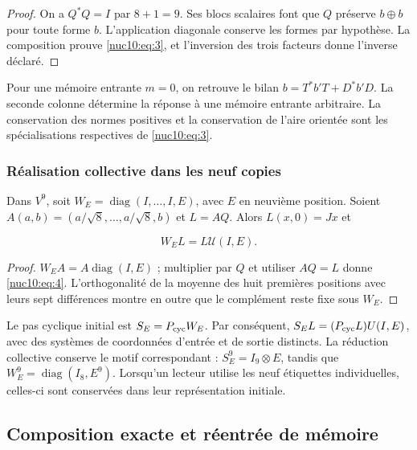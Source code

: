 \begin{proof}
On a \(Q^*Q=I\) par \(8+1=9\). Ses blocs scalaires font que \(Q\) préserve \(b\oplus b\) pour toute forme \(b\). L’application diagonale conserve les formes par hypothèse. La composition prouve \eqref{nuc10:eq:3}, et l’inversion des trois facteurs donne l’inverse déclaré.
\end{proof}

Pour une mémoire entrante \(m=0\), on retrouve le bilan \(b=T^*b'T+D^*b'D\). La seconde colonne détermine la réponse à une mémoire entrante arbitraire. La conservation des normes positives et la conservation de l’aire orientée sont les spécialisations respectives de \eqref{nuc10:eq:3}.

\subsubsection{Réalisation collective dans les neuf copies
}

Dans \(V^9\), soit \(W_E=\operatorname{diag}(I,\ldots,I,E)\), avec \(E\) en neuvième position. Soient \(A(a,b)=(a/\sqrt8,\allowbreak\ldots,\allowbreak a/\sqrt8,b)\) et \(L=AQ\). Alors \(L(x,0)=Jx\) et




\begin{equation}
W_E L=L\mathcal U(I,E).
\label{nuc10:eq:4}
\end{equation}



\begin{proof}
\(W_EA=A\operatorname{diag}(I,E)\) ; multiplier par \(Q\) et utiliser \(AQ=L\) donne \eqref{nuc10:eq:4}. L’orthogonalité de la moyenne des huit premières positions avec leurs sept différences montre en outre que le complément reste fixe sous \(W_E\).
\end{proof}

Le pas cyclique initial est \(S_E=P_{\rm cyc}W_E\). Par conséquent, \(S_EL=(P_{\rm cyc}L)U(I,E)\), avec des systèmes de coordonnées d’entrée et de sortie distincts. La réduction collective conserve le motif correspondant : \(S_E^9=I_9\otimes E\), tandis que \(W_E^9=\operatorname{diag}(I_8,E^9)\). Lorsqu’un lecteur utilise les neuf étiquettes individuelles, celles-ci sont conservées dans leur représentation initiale.

\subsection{Composition exacte et réentrée de mémoire
}

